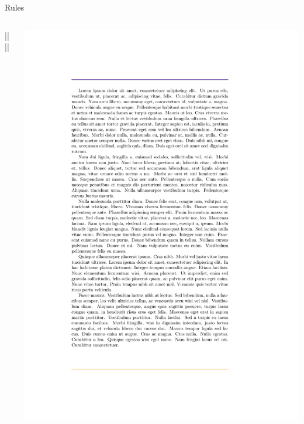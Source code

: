 \documentclass{beamer}
\begin{document}
\begin{frame}[fragile]{Rules}
  \begin{columns}
    \begin{column}{0.6\textwidth}
      \begin{latexcode}
        |\linebreak|{\footruleskip}
        |\linebreak|{\color{RoyalPurple}}{\color{Dandelion}}
      \end{latexcode}
    \end{column}

    \begin{column}{0.4\textwidth}
      \includegraphics[frame,width=\linewidth]{demo-rule}
    \end{column}
  \end{columns}
\end{frame}
\end{document}
